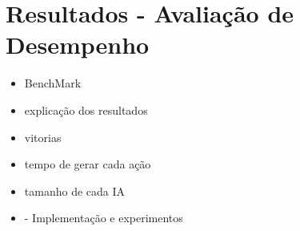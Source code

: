 
\chapter{\label{chap:ativ}Resultados - Avaliação de Desempenho}


\begin{itemize}
	\item BenchMark
	\item explicação dos resultados
	\item vitorias
	\item tempo de gerar cada ação
	\item tamanho de cada IA	
\end{itemize}

\begin{itemize}
	\item - Implementação e experimentos	
\end{itemize}

